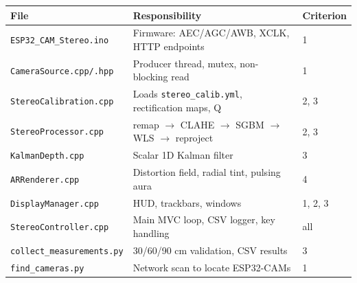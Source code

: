 \documentclass[11pt,a4paper]{article}
\begin{document}
\begin{center}
\begin{tabular}{p{4.2cm}p{5.5cm}p{4.5cm}}
\toprule
\textbf{File} & \textbf{Responsibility} & \textbf{Criterion} \\
\midrule
\texttt{ESP32\_CAM\_Stereo.ino}  & Firmware: AEC/AGC/AWB, XCLK, HTTP endpoints & 1 \\
\texttt{CameraSource.cpp/.hpp}   & Producer thread, mutex, non-blocking read     & 1 \\
\texttt{StereoCalibration.cpp}   & Loads \texttt{stereo\_calib.yml}, rectification maps, Q & 2, 3 \\
\texttt{StereoProcessor.cpp}     & remap $\to$ CLAHE $\to$ SGBM $\to$ WLS $\to$ reproject & 2, 3 \\
\texttt{KalmanDepth.cpp}         & Scalar 1D Kalman filter                       & 3 \\
\texttt{ARRenderer.cpp}          & Distortion field, radial tint, pulsing aura   & 4 \\
\texttt{DisplayManager.cpp}      & HUD, trackbars, windows                       & 1, 2, 3 \\
\texttt{StereoController.cpp}    & Main MVC loop, CSV logger, key handling       & all \\
\texttt{collect\_measurements.py}& 30/60/90 cm validation, CSV results           & 3 \\
\texttt{find\_cameras.py}        & Network scan to locate ESP32-CAMs             & 1 \\
\bottomrule
\end{tabular}
\end{center}
\end{document}
